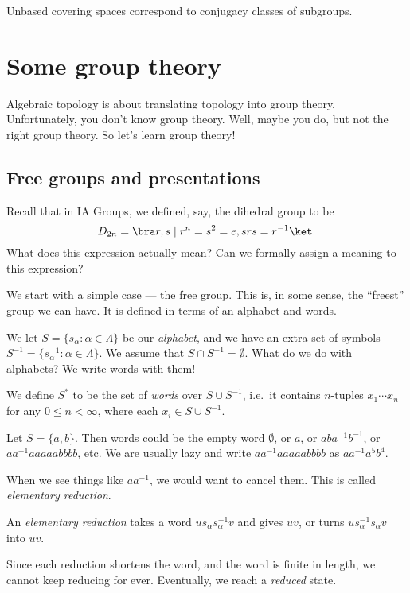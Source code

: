 \documentclass[a4paper]{article}
\begin{document}
\begin{prop}
  Unbased covering spaces correspond to conjugacy classes of subgroups.
\end{prop}

\section{Some group theory}
Algebraic topology is about translating topology into group theory. Unfortunately, you don't know group theory. Well, maybe you do, but not the right group theory. So let's learn group theory!

\subsection{Free groups and presentations}
Recall that in IA Groups, we defined, say, the dihedral group to be
\[
  D_{2n} = \bra r, s \mid r^n = s^2 = e, srs = r^{-1}\ket.
\]
What does this expression actually mean? Can we formally assign a meaning to this expression?

We start with a simple case --- the free group. This is, in some sense, the ``freest'' group we can have. It is defined in terms of an alphabet and words.

\begin{defi}
 We let $S = \{s_\alpha: \alpha \in \Lambda\}$ be our \emph{alphabet}, and we have an extra set of symbols $S^{-1} = \{s_\alpha^{-1}: \alpha \in \Lambda\}$. We assume that $S\cap S^{-1} = \emptyset$. What do we do with alphabets? We write words with them!

 We define $S^*$ to be the set of \emph{words} over $S\cup S^{-1}$, i.e.\ it contains $n$-tuples $x_1 \cdots x_n$ for any $0 \leq n < \infty$, where each $x_i \in S \cup S^{-1}$.
\end{defi}

\begin{eg}
  Let $S = \{a, b\}$. Then words could be the empty word $\emptyset$, or $a$, or $aba^{-1}b^{-1}$, or $aa^{-1}aaaaabbbb$, etc. We are usually lazy and write $aa^{-1}aaaaabbbb$ as $aa^{-1}a^5 b^4$.
\end{eg}

When we see things like $aa^{-1}$, we would want to cancel them. This is called \emph{elementary reduction}.
\begin{defi}
  An \emph{elementary reduction} takes a word $us_\alpha s_\alpha^{-1}v$ and gives $uv$, or turns $us_\alpha^{-1}s_\alpha v$ into $uv$.
\end{defi}
Since each reduction shortens the word, and the word is finite in length, we cannot keep reducing for ever. Eventually, we reach a \emph{reduced} state.
\end{document}
